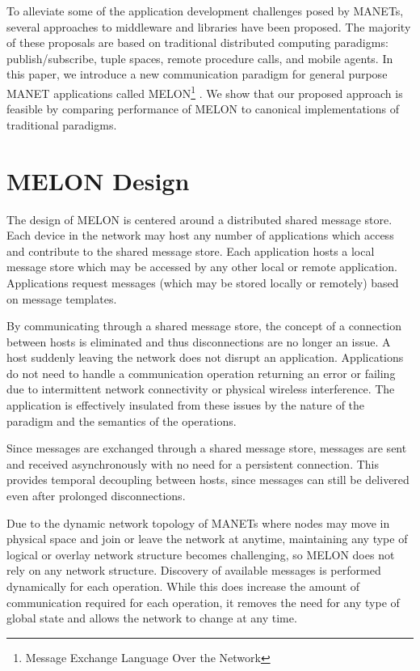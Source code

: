 \documentclass[lnicst]{svmultln}
\begin{document}
To alleviate some of the application development challenges posed by MANETs, several approaches to middleware and libraries have been proposed. The majority of these proposals are based on traditional distributed computing paradigms: publish/subscribe, tuple spaces, remote procedure calls, and mobile agents. In this paper, we introduce a new communication paradigm for general purpose MANET applications called MELON\footnote{Message Exchange Language Over the Network} . We show that our proposed approach is feasible by comparing performance of MELON to canonical implementations of traditional paradigms.

\section{MELON Design}

The design of MELON is centered around a distributed shared message store. Each device in the network may host any number of applications which access and contribute to the shared message store. Each application hosts a local message store which may be accessed by any other local or remote application. Applications request messages (which may be stored locally or remotely) based on message templates.

By communicating through a shared message store, the concept of a connection between hosts is eliminated and thus disconnections are no longer an issue. A host suddenly leaving the network does not disrupt an application. Applications do not need to handle a communication operation returning an error or failing due to intermittent network connectivity or physical wireless interference. The application is effectively insulated from these issues by the nature of the paradigm and the semantics of the operations.

Since messages are exchanged through a shared message store, messages are sent and received asynchronously with no need for a persistent connection. This provides temporal decoupling between hosts, since messages can still be delivered even after prolonged disconnections.

Due to the dynamic network topology of MANETs where nodes may move in physical space and join or leave the network at anytime, maintaining any type of logical or overlay network structure becomes challenging, so MELON does not rely on any network structure. Discovery of available messages is performed dynamically for each operation. While this does increase the amount of communication required for each operation, it removes the need for any type of global state and allows the network to change at any time.
\end{document}
